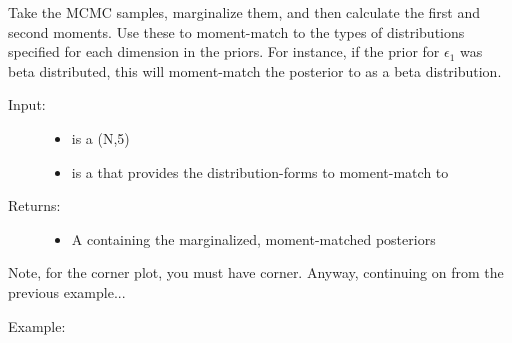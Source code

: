 \documentclass[letterpaper,10pt,english]{sphinxmanual}
\begin{document}
\begin{fulllineitems}
\label{code_mcmc:mcmc.create_posterior_collection}
Take the MCMC samples, marginalize them, and then calculate the first and second moments. Use these to moment-match to the types of distributions specified for each dimension in the priors. For instance, if the prior for \(\epsilon_1\) was beta distributed, this will moment-match the posterior to as a beta distribution.
\begin{description}
\item[{Input:}] \leavevmode\begin{itemize}
\item {} 
 is a (N,5) 

\item {} 
 is a  that provides the distribution-forms to moment-match to

\end{itemize}

\item[{Returns:}] \leavevmode\begin{itemize}
\item {} 
A  containing the marginalized, moment-matched posteriors

\end{itemize}

\end{description}

\end{fulllineitems}


Note, for the corner plot, you must have corner. Anyway, continuing on from the previous example...

Example:
\end{document}
